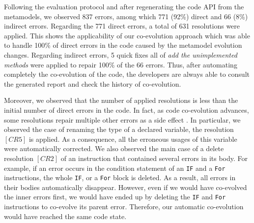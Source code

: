 	Following the evaluation protocol and after regenerating the code API from the metamodels, we observed 837 errors, among which 771 (92\%) direct and 66 (8\%) indirect errors. 
	Regarding the 771 direct errors, 
	a total of 631 resolutions were applied.  
	This shows the applicability of our co-evolution approach which was able to handle 100\% of direct errors in the code caused by the metamodel evolution changes. Regarding indirect errors, 5 quick fixes all of \emph{add the unimplemented methods}  were applied to repair 100\% of the 66 errors.
	Thus, after automating completely the co-evolution of the code, the developers are always able to consult the generated report and check the history of co-evolution.

	
	Moreover, we observed that the number of applied resolutions is less than the initial number of direct errors in the code. In fact, as code co-evolution advances, some resolutions repair multiple other errors as a side effect \cite{cuadrado2018quick,khelladi2019detecting}. 
	In particular, we observed the case of renaming the type of a declared variable, the resolution $[CR5]$ is applied. As a consequence, all the erroneous usages of this variable were automatically corrected. We also observed the main case of a delete resolution $[CR2]$ of an instruction that contained several errors in its body.
	For example, if an error occurs in the condition statement of an \texttt{IF} and a \texttt{For} instructions, the whole \texttt{IF}, or a \texttt{For} block is deleted. As a result, all errors in their bodies automatically disappear. However, even if we would have co-evolved the inner errors first, we would have ended up by deleting the \texttt{IF} and \texttt{For} instructions to co-evolve its parent error. Therefore, our automatic co-evolution would have reached the same code state. 
	
